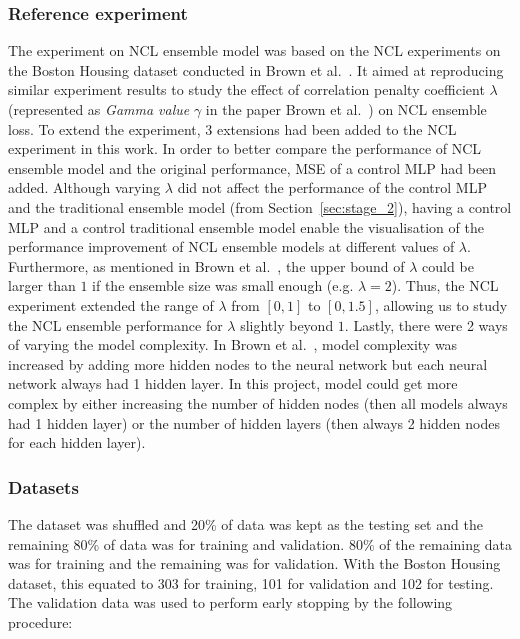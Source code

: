 \documentclass{article}
\begin{document}
\subsubsection{Reference experiment}
The experiment on NCL ensemble model was based on the NCL experiments on the Boston Housing dataset conducted in Brown et al.\ \cite{brown2005managing}. It aimed at reproducing similar experiment results to study the effect of correlation penalty coefficient $\lambda$ (represented as \textit{Gamma value} $\gamma$ in the paper Brown et al.\ \cite{brown2005managing}) on NCL ensemble loss. To extend the experiment, 3 extensions had been added to the NCL experiment in this work. In order to better compare the performance of NCL ensemble model and the original performance, MSE of a control MLP had been added. Although varying $\lambda$ did not affect the performance of the control MLP and the traditional ensemble model (from Section~\ref{sec:stage_2}), having a control MLP and a control traditional ensemble model enable the visualisation of the performance improvement of NCL ensemble models at different values of $\lambda$. Furthermore, as mentioned in Brown et al.\ \cite{brown2005managing}, the upper bound of $\lambda$ could be larger than $1$ if the ensemble size was small enough (e.g. $\lambda = 2$). Thus, the NCL experiment extended the range of $\lambda$ from $[0, 1]$ to $[0, 1.5]$, allowing us to study the NCL ensemble performance for $\lambda$ slightly beyond $1$. Lastly, there were 2 ways of varying the model complexity. In Brown et al.\ \cite{brown2005managing}, model complexity was increased by adding more hidden nodes to the neural network but each neural network always had 1 hidden layer. In this project, model could get more complex by either increasing the number of hidden nodes (then all models always had 1 hidden layer) or the number of hidden layers (then always 2 hidden nodes for each hidden layer). 


\subsubsection{Datasets}
The dataset was shuffled and 20\% of data was kept as the testing set and the remaining 80\% of data was for training and validation. 80\% of the remaining data was for training and the remaining was for validation. With the Boston Housing dataset, this equated to 303 for training, 101 for validation and 102 for testing. The validation data was used to perform early stopping by the following procedure: 
\end{document}
